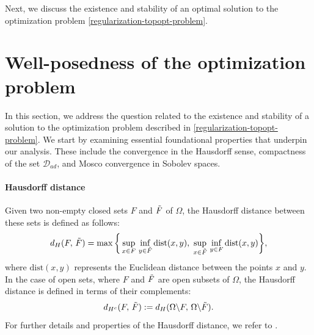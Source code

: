 \documentclass[a4paper,12pt,reqno,natbib]{amsart}
\begin{document}
Next, we discuss the existence and stability of an optimal solution to the optimization problem \eqref{regularization-topopt-problem}.


\section{Well-posedness of the optimization problem}\label{well-posedness-weak-solution-direct-problem}

In this section, we address the question related to the existence and stability of a solution to the optimization problem described in \eqref{regularization-topopt-problem}. We start by examining essential foundational properties that underpin our analysis. These include the convergence in the Hausdorff sense, compactness of the set $\mathcal{D}_{ad}$, and Mosco convergence in Sobolev spaces.


\vspace{0.4cm}
\paragraph{\bf Hausdorff distance} Given two non-empty closed sets $F$ and $\Tilde{F}$ of $\Omega$, the Hausdorff distance between these sets is defined as follows:
\begin{equation}
    d_H(F,\,\Tilde{F})=\max\bigg\{\sup_{x\in F}\,\inf_{y\in \Tilde{F}} \text{dist}(x,y),\; \sup_{x\in \Tilde{F}}\,\inf_{y\in {F}} \text{dist}(x,y)\bigg\},
\end{equation}
where $\text{dist}(x,y)$ represents the Euclidean distance between the points $x$ and $y.$ In the case of open sets, where $F$ and $\Tilde{F}$ are open subsets of $\Omega$, the Hausdorff distance is defined in terms of their complements:
\begin{equation}
    d_{H^c}(F,\,\Tilde{F}):=d_H(\Omega\backslash F,\,\Omega\backslash\Tilde{F}).
\end{equation}
For further details and properties of the Hausdorff distance, we refer to \cite[Chapter 2]{HenrotBook2005}.


\vspace{0.4cm}
\end{document}

